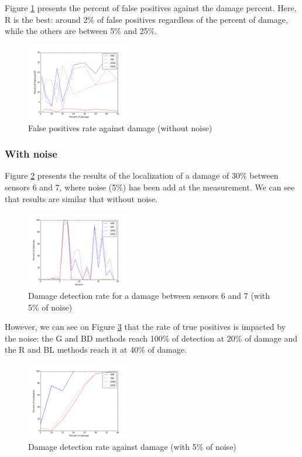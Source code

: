 \documentclass[journal]{IEEEtran}
\begin{document}
Figure \ref{fp} presents the percent of false positives against the damage percent. Here, R is the best: around 2\% of false positives regardless of the percent of damage, while the others are between 5\% and 25\%.


\begin{figure}[h!]
  \centering
  \includegraphics[width=0.4\textwidth]{images/fp.png}
  \caption{False positives rate against damage (without noise)}
  \label{fp}
\end{figure}



\subsubsection{With noise}



Figure \ref{damage30noise} presents the results of the localization of a damage of 30\% between sensors 6 and 7, where noise (5\%) has been add at the measurement. We can see that results are similar that without noise.


\begin{figure}[h!]
  \centering
  \includegraphics[width=0.4\textwidth]{images/damage30percent004noise.png}
  \caption{Damage detection rate for a damage between sensors 6 and 7 (with 5\% of noise)}
  \label{damage30noise}
\end{figure}

However, we can see on Figure \ref{detect_noise} that the rate of true positives is impacted by the noise: the G and BD methods reach 100\% of detection at 20\% of damage and the R and BL methods reach it at 40\% of damage.


\begin{figure}[h!]
  \centering
  \includegraphics[width=0.4\textwidth]{images/detect_noise004.png}
  \caption{Damage detection rate against damage (with 5\% of noise)}
  \label{detect_noise}
\end{figure}
\end{document}

